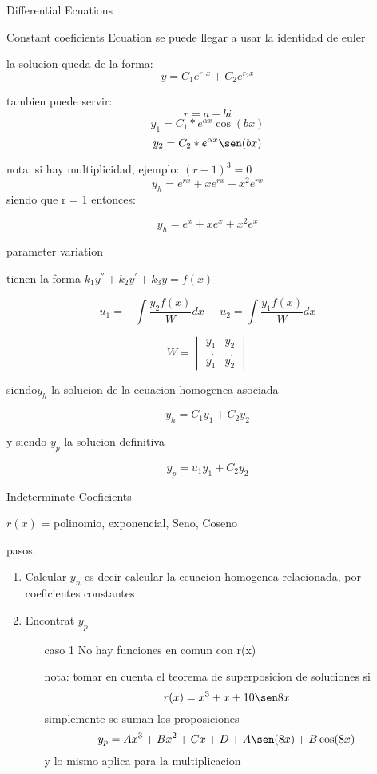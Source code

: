 \begin{section}{Differential Ecuations}
\begin{subsection}{Constant coeficients Ecuation}
		se puede llegar a usar la identidad de euler
		
		la solucion queda de la forma:
		$$y=C_1e^{r_1x} + C_2e^{r_2x}$$
		
		tambien puede servir:
		$$r = a + bi $$
		$$ y_1 = C_1*e^{ \alpha x } \cos (bx)$$
		$$ y_2 = C_2*e^{ \alpha x } \sen (bx) $$
		
		
		nota:
		si hay multiplicidad, ejemplo: $(r-1)^3 = 0 $
		$$y_h = e^{rx} + xe^{rx} + x^2e^{rx}$$
		siendo que r = 1 entonces:

		$$y_h = e^x + xe^x + x^2e^x$$	
	\end{subsection}
	\begin{subsection}{parameter variation}
		
		tienen la forma $k_1y^{''} + k_2y^{'} + k_3y = f(x) $
		
		$$u_1 = - \int \frac{y_2f(x)}{W} dx \;\; \;\;\; u_2 =  \int \frac{y_1f(x)}{W} dx $$
		
		$$
		W=
		\begin{vmatrix}
		y_1 & y_2 \\
			y_1^{'} & y_2^{'}
		\end{vmatrix}
		$$
		\begin{center}
			siendo$y_h$ la solucion de la ecuacion homogenea asociada
		
			$$ y_h = C_1y_1 + C_2y_2 $$
		
			y siendo $y_p$ la solucion definitiva
		
			$$ y_p = u_1y_1 + C_2y_2 $$
		
		\end{center}
	
	\end{subsection}
	\newpage
	\begin{subsection}{Indeterminate Coeficients}
		\begin{center}
			$r(x)$ = polinomio, exponencial, Seno, Coseno 
		\end{center}
		
		pasos:
		\begin{enumerate}
			\item Calcular $y_n$ es decir
				calcular la ecuacion homogenea relacionada, por coeficientes constantes
				
			\item Encontrat $y_p$
				\begin{enumerate}
					\item[caso 1] No hay funciones en comun con r(x)
		
						nota: tomar en cuenta el teorema de superposicion de soluciones
						si $$r(x) = x^3 + x +  10 \sen 8x$$
						simplemente se suman los proposiciones
						 $$y_p = Ax^3 + Bx^2 + Cx + D +  A \sen (8x) + B \cos (8x) $$
						 y lo mismo aplica para la multiplicacion
		

\end{enumerate}
\end{enumerate}
\end{subsection}
\end{section}
